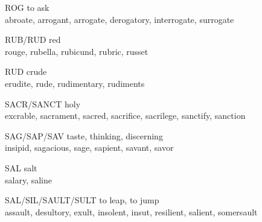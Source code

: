 \begin{flashcard}[Roots]{ROG}
to ask\\
\vspace{0.2in}
abroate, arrogant, arrogate, derogatory, interrogate, surrogate\\
\end{flashcard}

\begin{flashcard}[Roots]{RUB/RUD}
red\\
\vspace{0.2in}
rouge, rubella, rubicund, rubric, russet\\
\end{flashcard}

\begin{flashcard}[Roots]{RUD}
crude\\
\vspace{0.2in}
erudite, rude, rudimentary, rudiments\\
\end{flashcard}

\begin{flashcard}[Roots]{SACR/SANCT}
holy\\
\vspace{0.2in}
excrable, sacrament, sacred, sacrifice, sacrilege, sanctify, sanction\\
\end{flashcard}

\begin{flashcard}[Roots]{SAG/SAP/SAV}
taste, thinking, discerning\\
\vspace{0.2in}
insipid, sagacious, sage, sapient, savant, savor\\
\end{flashcard}

\begin{flashcard}[Roots]{SAL}
salt\\
\vspace{0.2in}
salary, saline\\
\end{flashcard}

\begin{flashcard}[Roots]{SAL/SIL/SAULT/SULT}
to leap, to jump\\
\vspace{0.2in}
assault, desultory, exult, insolent, insut, resilient, salient, somersault\\
\end{flashcard}

